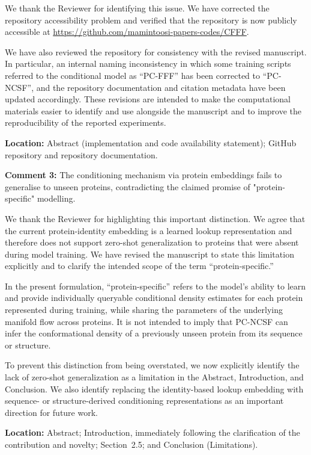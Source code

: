 \documentclass[a4paper,11pt]{article}
\newcommand{\reviewercomment}[2]{%
    \begin{reviewerscomment}
        \textbf{Comment #1:} #2
    \end{reviewerscomment}
}
\newcommand{\response}[1]{%
    \begin{myresponse}
        #1
    \end{myresponse}
    \vspace{5mm}
}
\begin{document}
\response{
We thank the Reviewer for identifying this issue. We have corrected the
repository accessibility problem and verified that the repository is now
publicly accessible at
\url{https://github.com/mamintoosi-papers-codes/CFFF}.

We have also reviewed the repository for consistency with the revised
manuscript. In particular, an internal naming inconsistency in which some
training scripts referred to the conditional model as ``PC-FFF'' has been
corrected to ``PC-NCSF'', and the repository documentation and citation
metadata have been updated accordingly. These revisions are intended to make
the computational materials easier to identify and use alongside the
manuscript and to improve the reproducibility of the reported experiments.

\textbf{Location:} Abstract (implementation and code availability statement);
GitHub repository and repository documentation.
}


\reviewercomment{3}{
The conditioning mechanism via protein embeddings fails to generalise to
unseen proteins, contradicting the claimed promise of "protein-specific"
modelling.
}

\response{
We thank the Reviewer for highlighting this important distinction. We agree
that the current protein-identity embedding is a learned lookup representation
and therefore does not support zero-shot generalization to proteins that were
absent during model training. We have revised the manuscript to state this
limitation explicitly and to clarify the intended scope of the term
``protein-specific.''

In the present formulation, ``protein-specific'' refers to the model's ability
to learn and provide individually queryable conditional density estimates for
each protein represented during training, while sharing the parameters of the
underlying manifold flow across proteins. It is not intended to imply that
PC-NCSF can infer the conformational density of a previously unseen protein
from its sequence or structure.

To prevent this distinction from being overstated, we now explicitly identify
the lack of zero-shot generalization as a limitation in the Abstract,
Introduction, and Conclusion. We also identify replacing the identity-based
lookup embedding with sequence- or structure-derived conditioning
representations as an important direction for future work.

\textbf{Location:} Abstract; Introduction, immediately following the
clarification of the contribution and novelty; Section~2.5; and Conclusion
(Limitations).
}
\end{document}
